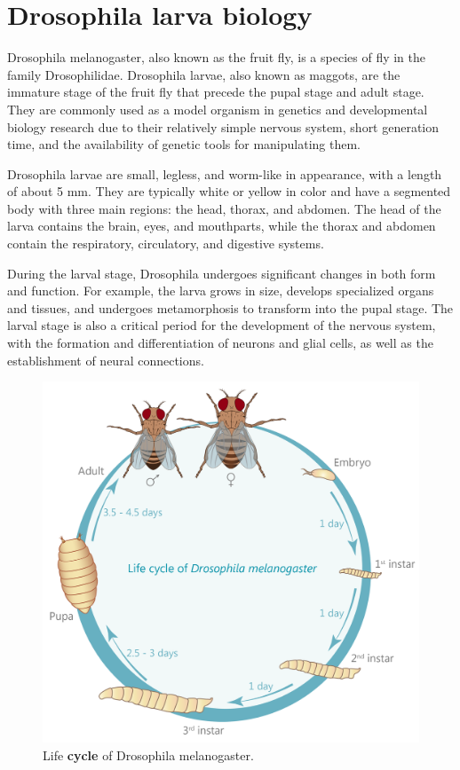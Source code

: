 \documentclass{book}
\begin{document}
	\section{Drosophila larva biology}
	Drosophila melanogaster, also known as the fruit fly, is a species of fly in the family Drosophilidae. Drosophila larvae, also known as maggots, are the immature stage of the fruit fly that precede the pupal stage and adult stage. They are commonly used as a model organism in genetics and developmental biology research due to their relatively simple nervous system, short generation time, and the availability of genetic tools for manipulating them.
	
	Drosophila larvae are small, legless, and worm-like in appearance, with a length of about 5 mm. They are typically white or yellow in color and have a segmented body with three main regions: the head, thorax, and abdomen. The head of the larva contains the brain, eyes, and mouthparts, while the thorax and abdomen contain the respiratory, circulatory, and digestive systems.
	
	During the larval stage, Drosophila undergoes significant changes in both form and function. For example, the larva grows in size, develops specialized organs and tissues, and undergoes metamorphosis to transform into the pupal stage. The larval stage is also a critical period for the development of the nervous system, with the formation and differentiation of neurons and glial cells, as well as the establishment of neural connections.
	
	\begin{figure}[h!]
		\centering
		\includegraphics[width=0.7\columnwidth]{resources/model_organism_fig_1.png}
		\caption{Life \textbf{cycle} of Drosophila melanogaster. \cite{example_website}}
		\label{fig:Life_cycle_of_fruit_fly}
	\end{figure}
	
\end{document}
